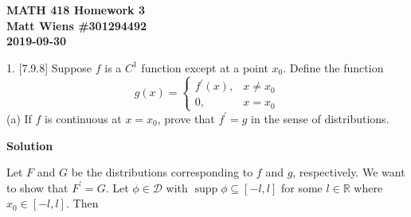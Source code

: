 \documentclass{article}
\DeclareMathOperator\supp{supp}
\begin{document}
\textbf{MATH 418 Homework 3} \\
\textbf{Matt Wiens \#301294492} \\
\textbf{2019-09-30}

1. [7.9.8] Suppose $f$ is a $C^{1}$ function except at a point $x_{0}$.
Define the function
%
\begin{equation*}
    g(x) =
        \begin{cases}
            f^{\prime}(x), & x \neq x_0 \\
            0, & x=x_0
        \end{cases}
\end{equation*}
%
(a) If $f$ is continuous at $x=x_0$, prove that $f^{\prime} = g$ in the
sense of distributions.

\textbf{Solution}

Let $F$ and $G$ be the distributions corresponding to $f$ and $g$,
respectively. We want to show that $F^\prime = G$. Let
$\phi \in \mathcal{D}$ with $\supp \phi \subseteq [-l, l]$ for some
$l \in \mathbb{R}$ where $x_0 \in [-l, l]$. Then
%
\end{document}
